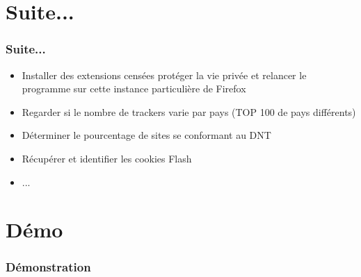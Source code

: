 \documentclass[compress]{beamer}
\begin{document}
  \section{Suite...}
  \begin{frame}
  \frametitle{Suite...}
    \begin{itemize}
      \item Installer des extensions censées protéger la vie privée et relancer le programme sur cette instance particulière de Firefox 
      \item Regarder si le nombre de trackers varie par pays (TOP 100 de pays différents)
      \item Déterminer le pourcentage de sites se conformant au DNT
      \item Récupérer et identifier les cookies Flash
      \item ...
    \end{itemize}
  \end{frame}
  
  \section{Démo}
  \begin{frame}
  \frametitle{Démonstration}
  \end{frame}

  
\end{document}
